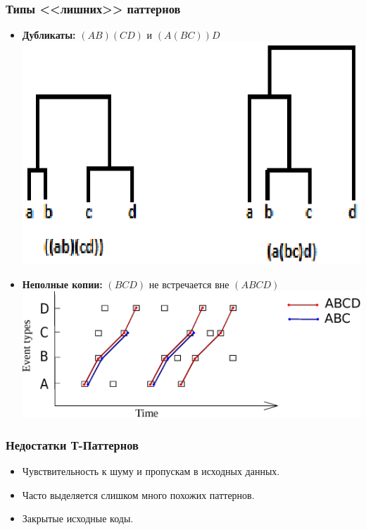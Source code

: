 \documentclass[smaller]{beamer}
\begin{document}
\begin{frame}	
  \frametitle{Типы <<лишних>> паттернов}
\begin{itemize}
 \item {\bf Дубликаты:} $(AB)(CD)$ и $(A(BC))D$
  \\ \includegraphics[scale=0.37]{dup_tree.eps} 
 \item {\bf Неполные копии:} $(BCD)$ не встречается вне $(ABCD)$
  \\ \includegraphics[scale=0.30]{dup_2.eps} 
\end{itemize}
\end{frame}

\begin{frame}
  \frametitle{Недостатки Т-Паттернов}
  \begin{itemize}
   \item Чувствительность к шуму и пропускам в исходных данных.
   \item Часто выделяется слишком много похожих паттернов.
   \item Закрытые исходные коды.
  \end{itemize}
\end{frame}
\end{document}
